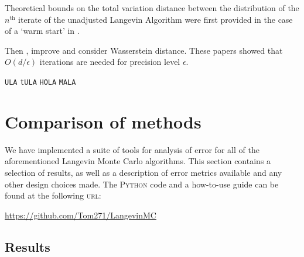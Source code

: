 Theoretical bounds on the total variation distance between the distribution of the $n^{\text{th}}$ iterate of the unadjusted Langevin Algorithm were first provided in the case of a `warm start' in \cite{dalalyan2017theoretical}. 

 Then \cite{durmus2016high}, \cite{durmus2017nonasymptotic} improve and consider Wasserstein distance.  These papers showed that $O(d/\epsilon)$ iterations are needed for precision level $\epsilon$.

\texttt{ULA} \cite{dalalyan2019user}
\texttt{tULA} \cite{Brosse18tULA}
\texttt{HOLA} \cite{Sabanis18tHOLA}
\texttt{MALA} \cite{bou2013nonasymptotic}



\section{Comparison of methods}
We have implemented a suite of tools for analysis of error for all of the aforementioned Langevin Monte Carlo algorithms. This section contains a selection of results, as well as a description of error metrics available and any other design choices made. The \textsc{Python} code and a how-to-use guide can be found at the following
\textsc{url}: \\

   \centerline{ \url{https://github.com/Tom271/LangevinMC}}


\subsection{Results}


